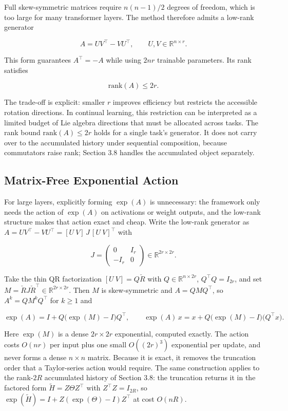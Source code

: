 \documentclass[
]{article}
\begin{document}
Full skew-symmetric matrices require \(n(n-1)/2\) degrees of freedom, which is too large for many transformer layers. The method therefore admits a low-rank generator

\[
A=UV^\top-VU^\top,\qquad U,V\in\mathbb{R}^{n\times r}.
\]

This form guarantees \(A^\top=-A\) while using \(2nr\) trainable parameters. Its rank satisfies

\[
\mathrm{rank}(A)\leq 2r.
\]

The trade-off is explicit: smaller \(r\) improves efficiency but restricts the accessible rotation directions. In continual learning, this restriction can be interpreted as a limited budget of Lie algebra directions that must be allocated across tasks. The rank bound \(\mathrm{rank}(A)\leq 2r\) holds for a single task's generator. It does not carry over to the accumulated history under sequential composition, because commutators raise rank; Section 3.8 handles the accumulated object separately.

\subsection{Matrix-Free Exponential Action}\label{matrix-free-exponential-action}

For large layers, explicitly forming \(\exp(A)\) is unnecessary: the framework only needs the action of \(\exp(A)\) on activations or weight outputs, and the low-rank structure makes that action exact and cheap. Write the low-rank generator as \(A=UV^\top-VU^\top=[U\ V]\,J\,[U\ V]^\top\) with

\[
J=\begin{pmatrix}0 & I_r\\ -I_r & 0\end{pmatrix}\in\mathbb{R}^{2r\times 2r}.
\]

Take the thin QR factorization \([U\ V]=Q\check{R}\) with \(Q\in\mathbb{R}^{n\times 2r}\), \(Q^\top Q=I_{2r}\), and set \(M=\check{R}J\check{R}^\top\in\mathbb{R}^{2r\times 2r}\). Then \(M\) is skew-symmetric and \(A=QMQ^\top\), so \(A^k=QM^kQ^\top\) for \(k\ge 1\) and

\[
\exp(A)=I+Q\big(\exp(M)-I\big)Q^\top,\qquad
\exp(A)\,x=x+Q\big(\exp(M)-I\big)\big(Q^\top x\big).
\]

Here \(\exp(M)\) is a dense \(2r\times 2r\) exponential, computed exactly. The action costs \(O(nr)\) per input plus one small \(O((2r)^3)\) exponential per update, and never forms a dense \(n\times n\) matrix. Because it is exact, it removes the truncation order that a Taylor-series action would require. The same construction applies to the rank-\(2R\) accumulated history of Section 3.8: the truncation returns it in the factored form \(\tilde{H}=Z\Theta Z^\top\) with \(Z^\top Z=I_{2R}\), so \(\exp(\tilde{H})=I+Z(\exp(\Theta)-I)Z^\top\) at cost \(O(nR)\).
\end{document}
